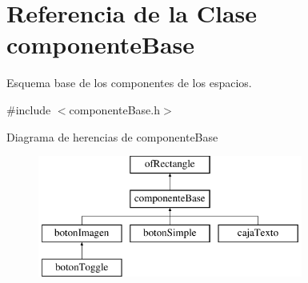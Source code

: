 \hypertarget{classcomponente_base}{}\section{Referencia de la Clase componente\+Base}
\label{classcomponente_base}


Esquema base de los componentes de los espacios.  




{\ttfamily \#include $<$componente\+Base.\+h$>$}

Diagrama de herencias de componente\+Base\begin{figure}[H]
\begin{center}
\leavevmode
\includegraphics[height=4.000000cm]{classcomponente_base}
\end{center}
\end{figure}
